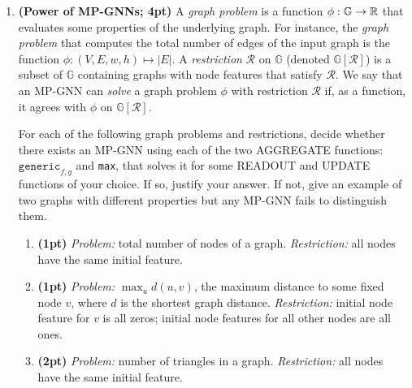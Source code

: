 \documentclass[12pt,letterpaper]{article}
\begin{document}
\begin{enumerate}[resume]
    \item \textbf{(Power of MP-GNNs; 4pt)} A \emph{graph problem} is a function $\phi: \mathbb{G} \to \mathbb{R}$ that evaluates some properties of the underlying graph. For instance, the \emph{graph problem} that computes the total number of edges of the input graph is the function $\phi: (V,E,w,h) \mapsto |E|$. A \emph{restriction} $\mathcal{R}$ on $\mathbb{G}$ (denoted $\mathbb{G}[\mathcal{R}]$) is a subset of $\mathbb{G}$ containing graphs with node features that satisfy $\mathcal{R}$. We say that an MP-GNN can \emph{solve} a graph problem $\phi$ with restriction $\mathcal{R}$ if, as a function, it agrees with $\phi$ on $\mathbb{G}[\mathcal{R}]$.
    
    
    For each of the following graph problems and restrictions, decide whether there exists an MP-GNN using each of the two AGGREGATE functions: $\texttt{generic}_{f,g}$ and \texttt{max}, that solves it for some READOUT and UPDATE functions of your choice. If so, justify your answer. If not, give an example of two graphs with different properties but any MP-GNN fails to distinguish them. \begin{enumerate}
        \item \textbf{(1pt)}  \emph{Problem:} total number of nodes of a graph.  \emph{Restriction:} all nodes have the same initial feature.
        
        \item \textbf{(1pt)} \emph{Problem:} $\max_u d(u, v)$, the maximum distance to some fixed node $v$, where $d$ is the shortest graph distance. \emph{Restriction:} initial node feature for $v$ is all zeros; initial node features for all other nodes are all ones.
        

        
        \item \textbf{(2pt)} \emph{Problem:} number of triangles in a graph. \emph{Restriction:} all nodes have the same initial feature.
        
        

\end{enumerate}
\end{enumerate}
\end{document}
